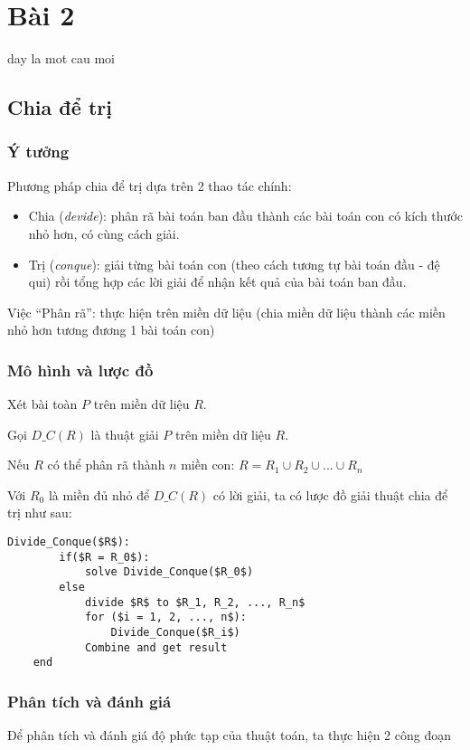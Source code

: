 \section{Bài 2}

day la mot cau moi

\subsection{Chia để trị}

\subsubsection{Ý tưởng}
Phương pháp chia để trị dựa trên 2 thao tác chính:
\begin{itemize}
    \item Chia (\textit{devide}): phân rã bài toán ban đầu thành các bài toán con có kích thước
    nhỏ hơn, có cùng cách giải.
    \item Trị (\textit{conque}): giải từng bài toán con (theo cách tương tự bài toán đầu - đệ
    qui) rồi tổng hợp các lời giải để nhận kết quả của bài toán ban đầu.
\end{itemize}

Việc “Phân rã”: thực hiện trên miền dữ liệu (chia miền dữ liệu thành các miền
nhỏ hơn tương đương 1 bài toán con)

\subsubsection{Mô hình và lược đồ}
Xét bài toàn $P$ trên miền dữ liệu $R$.

Gọi $D\_C(R)$ là thuật giải $P$ trên miền dữ liệu $R$.

Nếu $R$ có thể phân rã thành $n$ miền con: $R = R_1 \cup R_2 \cup ... \cup R_n$

Với $R_0$ là miền đủ nhỏ để  $D\_C(R)$ có lời giải, ta có lược đồ giải thuật chia để trị như sau:

\begin{lstlisting}[style=algo]
    Divide_Conque($R$):
        if($R = R_0$):
            solve Divide_Conque($R_0$)
        else
            divide $R$ to $R_1, R_2, ..., R_n$
            for ($i = 1, 2, ..., n$):
                Divide_Conque($R_i$)
            Combine and get result
    end
\end{lstlisting}

\subsubsection{Phân tích và đánh giá}
Để phân tích và đánh giá độ phức tạp của thuật toán, ta thực hiện 2 công đoạn

